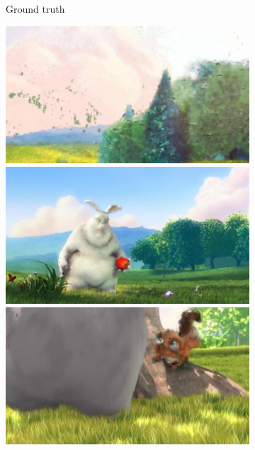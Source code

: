 \begin{figure}
\begin{subfigure}[t]{0.135\textwidth}
		\caption{Ground truth}
	\end{subfigure}
	\begin{subfigure}[t]{0.135\textwidth}
		\includegraphics[width=\textwidth]{figures/stereo/bbb_frame-0004-3}\\
		\includegraphics[width=\textwidth]{figures/stereo/bbb_frame-0092-3}\\
		\includegraphics[width=\textwidth]{figures/stereo/bbb_frame-0124-3}\\

\end{subfigure}
\end{figure}
